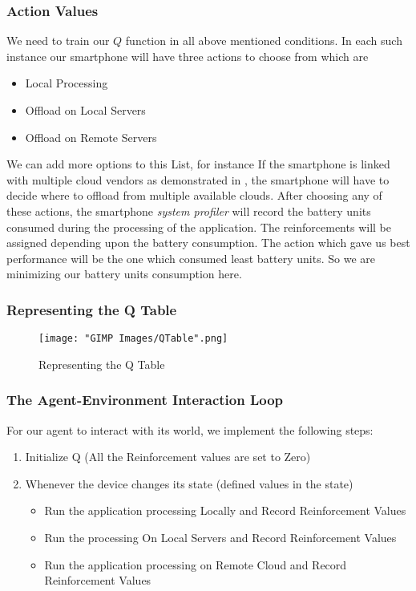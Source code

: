 \documentclass[12pt]{report}
\begin{document}
\subsubsection{Action Values}
We need to train our $Q$ function in all above mentioned conditions. In each such instance our smartphone will have three actions to choose from which are
\begin{itemize}
   \item Local Processing
   \item Offload on Local Servers
   \item Offload on Remote Servers
\end{itemize}
We can add more options to this List, for instance If the smartphone is linked with multiple cloud vendors as demonstrated in \cite{flores2011generic}, the smartphone will have to decide where to offload from multiple available clouds.
After choosing any of these actions, the smartphone \textit{system profiler} will record the battery units consumed during the processing of the application. The reinforcements will be assigned depending upon the battery consumption. The action which gave us best performance will be the one which consumed least battery units. So we are minimizing our battery units consumption here.

\subsubsection{Representing the Q Table}

\begin{figure}[h!]
  \centering
  \texttt{[image: "GIMP Images/QTable".png]}
  \caption{Representing the Q Table}
  \label{fig:QTable}
\end{figure}

\subsubsection{The Agent-Environment Interaction Loop}
For our agent to interact with its world, we implement the following steps:
\begin{enumerate}
	\item Initialize Q (All the Reinforcement values are set to Zero)
	\item Whenever the device changes its state (defined values in the state)\begin{itemize}
					\item Run the application processing Locally and Record Reinforcement Values
					\item Run the processing On Local Servers and Record Reinforcement Values
					\item Run the application processing on Remote Cloud and Record Reinforcement Values
					\end{itemize}


\end{enumerate}
\end{document}
